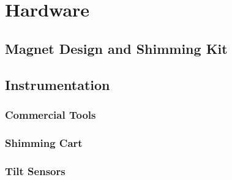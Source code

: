 \section{Hardware}
\label{sec:Hardware}

\subsection{Magnet Design and Shimming Kit}

\subsection{Instrumentation}

\subsubsection{Commercial Tools}

\subsubsection{Shimming Cart}

\subsubsection{Tilt Sensors}

